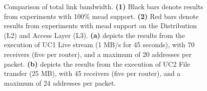\begin{figure}
    \begin{center}
        
    \end{center}
    \caption[UC2 File Transfer: Comparison of total link bandwidth]{
        \nucii{} Comparison of total link bandwidth.
        \textbf{(1)} Black bars denote results from experiments with 100\%
            \gls{mead} support.
        \textbf{(2)} Red bars denote results from experiments with \gls{mead}
            support on the Distribution (L2) and Access Layer (L3).
        \textbf{(a)} depicts the results from the execution of UC1 Live
            stream (1 MB/s for 45 seconds), with 70 receivers (five per router),
            and a maximum of 20 addresses per packet.
        \textbf{(b)} depicts the results from the execution of UC2 File
            transfer (25 MB), with 45 receivers (five per router), and a maximum
            of 24 addresses per packet.
    }
    \label{fig:link_bw_l2l3_100}
\end{figure}


